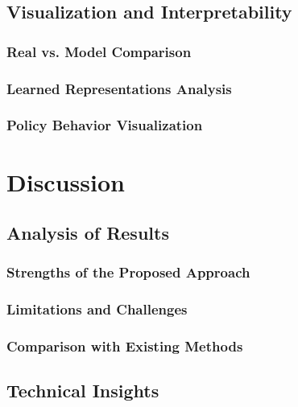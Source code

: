 \documentclass[
	english,
	ruledheaders=section,
	class=report,
	thesis={type=master},
	accentcolor=9c,
	custommargins=true,
	marginpar=false,
	parskip=half-,
	fontsize=11pt,
]{tudapub}
\begin{document}
\section{Visualization and Interpretability}
\label{sec:visualization}

\subsection{Real vs. Model Comparison}
\label{subsec:real_vs_model}

\subsection{Learned Representations Analysis}
\label{subsec:representation_analysis}

\subsection{Policy Behavior Visualization}
\label{subsec:policy_visualization}

\chapter{Discussion}
\label{chap:discussion}

\section{Analysis of Results}
\label{sec:results_analysis}

\subsection{Strengths of the Proposed Approach}
\label{subsec:strengths}

\subsection{Limitations and Challenges}
\label{subsec:limitations_challenges}

\subsection{Comparison with Existing Methods}
\label{subsec:comparison}

\section{Technical Insights}
\label{sec:technical_insights}
\end{document}
